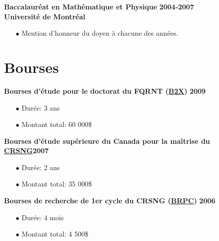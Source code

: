 \documentclass[paper=letter,fontsize=11pt]{scrartcl} %
\begin{document}
\pagebreak

\noindent \textbf{Baccalauréat en Mathématique et Physique} \hfill \textbf{2004-2007}\\
\textbf{Université de Montréal}
\begin{itemize}
\item[$\bullet$] Mention d'honneur du doyen à chacune des années.  
\end{itemize}


\section*{Bourses}

\noindent \textbf{Bourses d'étude pour le doctorat du FQRNT (\href{http://www.frqnt.gouv.qc.ca/bourses-et-subventions/consulter-les-programmes-remplir-une-demande/bourse/bourses-de-2supesup-et-3supesup-cycles-t677hwek1530032348502}{B2X})} \hfill \textbf{2009}
\begin{itemize}
\item[$\bullet$] Durée: 3 ans 
\item[$\bullet$] Montant total: 60 000\$
\end{itemize}

\vspace{0.25\baselineskip}

\noindent \textbf{Bourses d'étude supérieure du Canada pour la maîtrise du \href{http://www.nserc-crsng.gc.ca/Students-Etudiants/PG-CS/CGSM-BESCM_fra.asp}{CRSNG}}\hfill \textbf{2007}
\begin{itemize}
\item[$\bullet$] Durée: 2 ans 
\item[$\bullet$] Montant total: 35 000\$
\end{itemize}

\vspace{0.25\baselineskip}

\noindent \textbf{Bourses de recherche de 1er cycle du CRSNG (\href{http://www.nserc-crsng.gc.ca/Students-Etudiants/UG-PC/USRA-BRPC_fra.asp}{BRPC})} \hfill \textbf{2006}
\begin{itemize}
\item[$\bullet$] Durée: 4 mois
\item[$\bullet$] Montant total: 4 500\$
\end{itemize}
\end{document}
